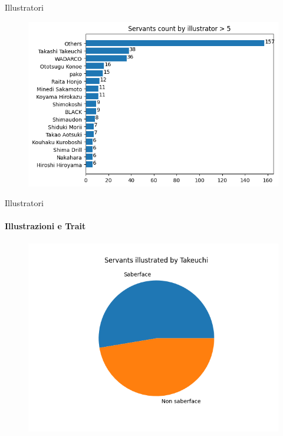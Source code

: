 \documentclass{beamer}
\begin{document}
\begin{darkframes}
  \begin{frame}{Illustratori}
    \begin{figure}
      \centering
      \includegraphics[scale=0.55]{./images/illustrators.png}
    \end{figure}
  \end{frame}

  \begin{frame}{Illustratori}
    \framesubtitle{Illustrazioni e Trait}
    \begin{figure}
      \centering
      \includegraphics[scale=0.55]{./images/saberface.png}
    \end{figure}
  \end{frame}


\end{darkframes}
\end{document}
